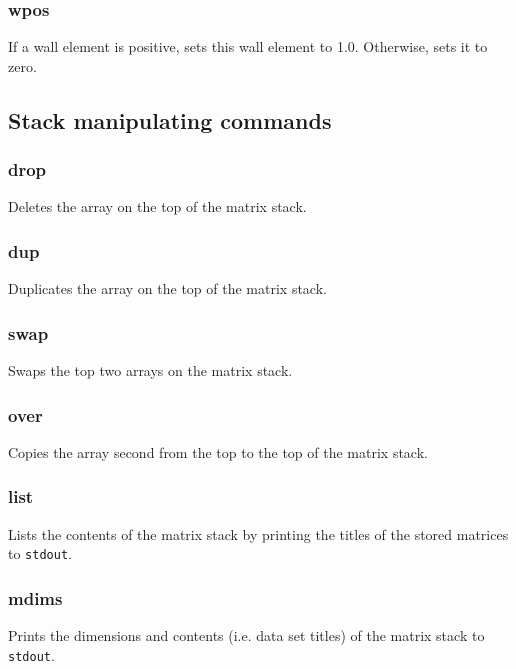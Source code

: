 \documentclass[a4paper,10pt]{report}
\begin{document}
\subsubsection{wpos}\label{sec:wpos}
If a wall element is positive, sets this wall element to 1.0.
Otherwise, sets it to zero.


\subsection{Stack manipulating commands}\label{sec:stack}

\subsubsection{drop}\label{sec:drop}
Deletes the array on the top of the matrix stack.

\subsubsection{dup}\label{sec:dup}
Duplicates the array on the top of the matrix stack.

\subsubsection{swap}\label{sec:swap}
Swaps the top two arrays on the matrix stack.

\subsubsection{over}\label{sec:over}
Copies the array second from the top to the top of the matrix stack.

\subsubsection{list}\label{sec:list}
Lists the contents of the matrix stack by printing the titles
of the stored matrices to {\tt stdout}.

\subsubsection{mdims}\label{sec:mdims}
Prints the dimensions and contents (i.e. data set titles) of the matrix
stack to {\tt stdout}.
\end{document}

